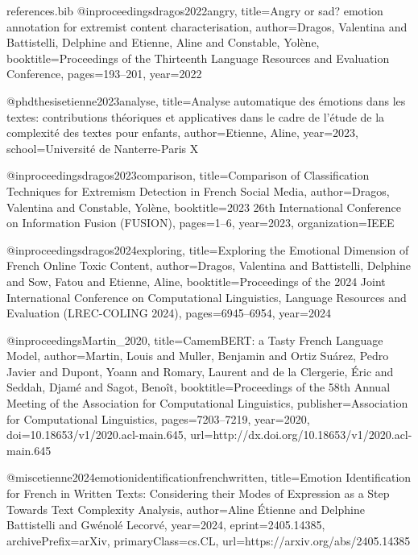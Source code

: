 \begin{filecontents*}{references.bib}
@inproceedings{dragos2022angry,
  title={Angry or sad? emotion annotation for extremist content characterisation},
  author={Dragos, Valentina and Battistelli, Delphine and Etienne, Aline and Constable, Yol{\`e}ne},
  booktitle={Proceedings of the Thirteenth Language Resources and Evaluation Conference},
  pages={193--201},
  year={2022}
}

@phdthesis{etienne2023analyse,
  title={Analyse automatique des {\'e}motions dans les textes: contributions th{\'e}oriques et applicatives dans le cadre de l'{\'e}tude de la complexit{\'e} des textes pour enfants},
  author={Etienne, Aline},
  year={2023},
  school={Universit{\'e} de Nanterre-Paris X}
}

@inproceedings{dragos2023comparison,
  title={Comparison of Classification Techniques for Extremism Detection in French Social Media},
  author={Dragos, Valentina and Constable, Yol{\`e}ne},
  booktitle={2023 26th International Conference on Information Fusion (FUSION)},
  pages={1--6},
  year={2023},
  organization={IEEE}
}

@inproceedings{dragos2024exploring,
  title={Exploring the Emotional Dimension of French Online Toxic Content},
  author={Dragos, Valentina and Battistelli, Delphine and Sow, Fatou and Etienne, Aline},
  booktitle={Proceedings of the 2024 Joint International Conference on Computational Linguistics, Language Resources and Evaluation (LREC-COLING 2024)},
  pages={6945--6954},
  year={2024}
}

@inproceedings{Martin_2020,
  title={{CamemBERT}: a Tasty French Language Model},
  author={Martin, Louis and Muller, Benjamin and Ortiz Su{\'a}rez, Pedro Javier and Dupont, Yoann and Romary, Laurent and de la Clergerie, {\'E}ric and Seddah, Djam{\'e} and Sagot, Beno{\^i}t},
  booktitle={Proceedings of the 58th Annual Meeting of the Association for Computational Linguistics},
  publisher={Association for Computational Linguistics},
  pages={7203--7219},
  year={2020},
  doi={10.18653/v1/2020.acl-main.645},
  url={http://dx.doi.org/10.18653/v1/2020.acl-main.645}
}

@misc{etienne2024emotionidentificationfrenchwritten,
  title={Emotion Identification for French in Written Texts: Considering their Modes of Expression as a Step Towards Text Complexity Analysis},
  author={Aline {\'E}tienne and Delphine Battistelli and Gw{\'e}nol{\'e} Lecorv{\'e}},
  year={2024},
  eprint={2405.14385},
  archivePrefix={arXiv},
  primaryClass={cs.CL},
  url={https://arxiv.org/abs/2405.14385}
}


\end{filecontents*}
